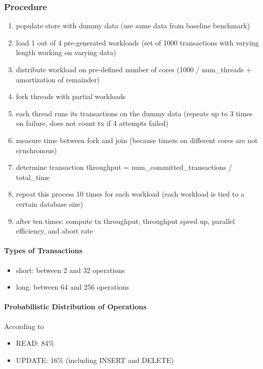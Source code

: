 \subsubsection{Procedure}

\begin{enumerate}
    \item populate store with dummy data (use same data from baseline benchmark)
    \item load 1 out of 4 pre-generated workloads (set of 1000 transactions with varying length working on varying data)
    \item distribute workload on pre-defined number of cores (1000 / num\_threads + amortization of remainder)
    \item fork threads with partial workloads
    \item each thread runs its transactions on the dummy data (repeats up to 3 times on failure, does not count tx if 4 attempts failed)
    \item measure time between fork and join (because timers on different cores are not synchronous)
    \item determine transaction throughput = num\_committed\_transactions / total\_time
    \item repeat this process 10 times for each workload (each workload is tied to a certain database size)
    \item after ten times: compute tx throughput, throughput speed up, parallel efficiency, and abort rate
\end{enumerate}

\paragraph{Types of Transactions}

\begin{itemize}
    \item short: between 2 and 32 operations
    \item long: between 64 and 256 operations
\end{itemize}

\paragraph{Probabilistic Distribution of Operations}

According to \cite{andrei2017sap}

\begin{itemize}
    \item READ: 84\%
    \item UPDATE: 16\% (including INSERT and DELETE)
\end{itemize}

